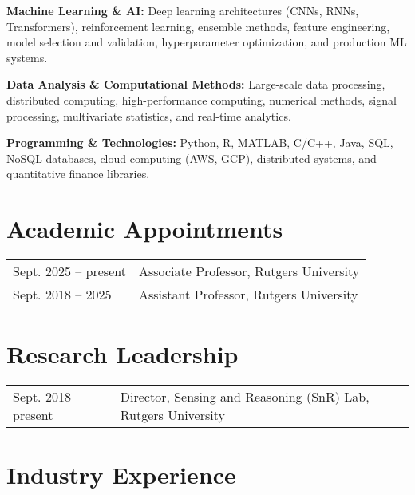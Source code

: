 \documentclass[12pt]{article}
\begin{document}
\textbf{Machine Learning \& AI:} Deep learning architectures (CNNs, RNNs, Transformers), reinforcement learning, ensemble methods, feature engineering, model selection and validation, hyperparameter optimization, and production ML systems.

\textbf{Data Analysis \& Computational Methods:} Large-scale data processing, distributed computing, high-performance computing, numerical methods, signal processing, multivariate statistics, and real-time analytics.

\textbf{Programming \& Technologies:} Python, R, MATLAB, C/C++, Java, SQL, NoSQL databases, cloud computing (AWS, GCP), distributed systems, and quantitative finance libraries.

\section{Academic Appointments}

\begin{tabular}{l l}
Sept. 2025 -- present & Associate Professor, Rutgers University \\
Sept. 2018 -- 2025 & Assistant Professor, Rutgers University \\
\end{tabular}

\section{Research Leadership}

\begin{tabular}{l l}
Sept. 2018 -- present & Director, Sensing and Reasoning (SnR) Lab, Rutgers University \\
\end{tabular}

\section{Industry Experience}
\end{document}
